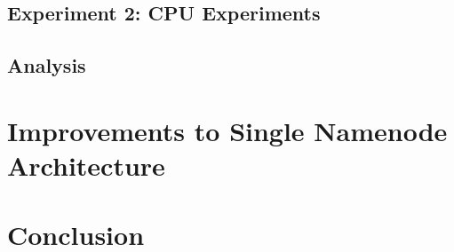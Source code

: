 \documentclass[11pt, a4paper]{article}
\begin{document}
\begin{multicols*}{2}

\subsection{Experiment 2: CPU Experiments}


\subsection{Analysis}




\section{Improvements to Single Namenode Architecture}




% 

\section{Conclusion}





\end{multicols*}
\end{document}
